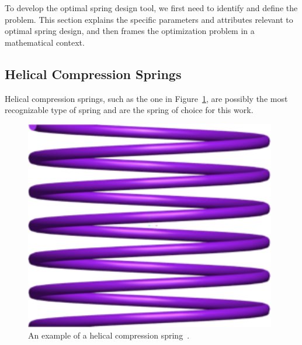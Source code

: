 \documentclass[10pt]{article}
\begin{document}
To develop the optimal spring design tool, we first need to identify and define the problem. This section explains the specific parameters and attributes relevant to optimal spring design, and then frames the optimization problem in a mathematical context.

\subsection{Helical Compression Springs}
\label{sec:Springs}

Helical compression springs, such as the one in Figure~\ref{fig:Spring}, are possibly the most recognizable type of spring and are the spring of choice for this work. 

		\begin{figure}[h]
		 \begin{center}\includegraphics[scale=.2]{Spring.png}\end{center}
		 \caption{An example of a helical compression spring~\cite{Massad2015}.}
		 \label{fig:Spring}
		 
		 \end{figure}
\end{document}
